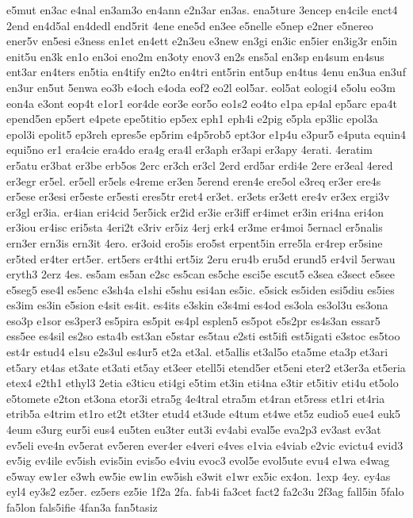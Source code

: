 {e5mut
en3ac
e4nal
en3am3o
en4ann
e2n3ar
en3as.
ena5ture
3encep
en4cile
enct4
2end
en4d5al
en4dedl
end5rit
4ene
ene5d
en3ee
e5nelle
e5nep
e2ner
e5nereo
ener5v
en5esi
e3ness
en1et
en4ett
e2n3eu
e3new
en3gi
en3ic
en5ier
en3ig3r
en5in
enit5u
en3k
en1o
en3oi
eno2m
en3oty
enov3
en2s
ens5al
en3sp
en4sum
en4sus
ent3ar
en4ters
en5tia
en4tify
en2to
en4tri
ent5rin
ent5up
en4tus
4enu
en3ua
en3uf
en3ur
en5ut
5enwa
eo3b
e4och
e4oda
eof2
eo2l
eol5ar.
eol5at
eologi4
e5olu
eo3m
eon4a
e3ont
eop4t
e1or1
eor4de
eor3e
eor5o
eo1s2
eo4to
e1pa
ep4al
ep5arc
epa4t
epend5en
ep5ert
e4pete
epe5titio
ep5ex
eph1
eph4i
e2pig
e5pla
ep3lic
epol3a
epol3i
epolit5
ep3reh
epres5e
ep5rim
e4p5rob5
ept3or
e1p4u
e3pur5
e4puta
equin4
equi5no
er1
era4cie
era4do
era4g
era4l
er3aph
er3api
er3apy
4erati.
4eratim
er5atu
er3bat
er3be
erb5os
2erc
er3ch
er3cl
2erd
erd5ar
erdi4e
2ere
er3eal
4ered
er3egr
er5el.
er5ell
er5els
e4reme
er3en
5erend
eren4e
ere5ol
e3req
er3er
ere4s
er5ese
er3esi
er5este
er5esti
eres5tr
eret4
er3et.
er3ets
er3ett
ere4v
er3ex
ergi3v
er3gl
er3ia.
er4ian
eri4cid
5er5ick
er2id
er3ie
er3iff
er4imet
er3in
eri4na
eri4on
er3iou
er4isc
eri5sta
4eri2t
e3riv
er5iz
4erj
erk4
er3me
er4moi
5ernacl
er5nalis
ern3er
ern3is
ern3it
4ero.
er3oid
ero5is
ero5st
erpent5in
erre5la
er4rep
er5sine
er5ted
er4ter
ert5er.
ert5ers
er4thi
ert5iz
2eru
eru4b
eru5d
erund5
er4vil
5erwau
eryth3
2erz
4es.
es5am
es5an
e2sc
es5can
es5che
esci5e
escut5
e3sea
e3sect
e5see
e5seg5
ese4l
es5enc
e3sh4a
e1shi
e5shu
esi4an
es5ic.
e5sick
es5iden
esi5diu
es5ies
es3im
es3in
e5sion
e4sit
es4it.
es4its
e3skin
e3s4mi
es4od
es3ola
es3ol3u
es3ona
eso3p
e1sor
es3per3
es5pira
es5pit
es4pl
esplen5
es5pot
e5s2pr
es4s3an
essar5
ess5ee
es4sil
es2so
esta4b
est3an
e5star
es5tau
e2sti
est5ifi
est5igati
e3stoc
es5too
est4r
estud4
e1su
e2s3ul
es4ur5
et2a
et3al.
et5allis
et3al5o
eta5me
eta3p
et3ari
et5ary
et4as
et3ate
et3ati
et5ay
et3eer
etell5i
etend5er
et5eni
eter2
et3er3a
et5eria
etex4
e2th1
ethyl3
2etia
e3ticu
eti4gi
e5tim
et3in
eti4na
e3tir
et5itiv
eti4u
et5olo
e5tomete
e2ton
et3ona
etor3i
etra5g
4e4tral
etra5m
et4ran
et5ress
et1ri
et4ria
etrib5a
e4trim
et1ro
et2t
et3ter
etud4
et3ude
e4tum
et4we
et5z
eudio5
eue4
euk5
4eum
e3urg
eur5i
eus4
eu5ten
eu3ter
eut3i
ev4abi
eval5e
eva2p3
ev3ast
ev3at
ev5eli
eve4n
ev5erat
ev5eren
ever4er
e4veri
e4ves
e1via
e4viab
e2vic
evictu4
evid3
ev5ig
ev4ile
ev5ish
evis5in
evis5o
e4viu
evoc3
evol5e
evol5ute
evu4
e1wa
e4wag
e5way
ew1er
e3wh
ew5ie
ew1in
ew5ish
e3wit
e1wr
ex5ic
ex4on.
1exp
4ey.
ey4as
eyl4
ey3s2
ez5er.
ez5ers
ez5ie
1f2a
2fa.
fab4i
fa3cet
fact2
fa2c3u
2f3ag
fall5in
5falo
fa5lon
fals5ifie
4fan3a
fan5tasiz
}
